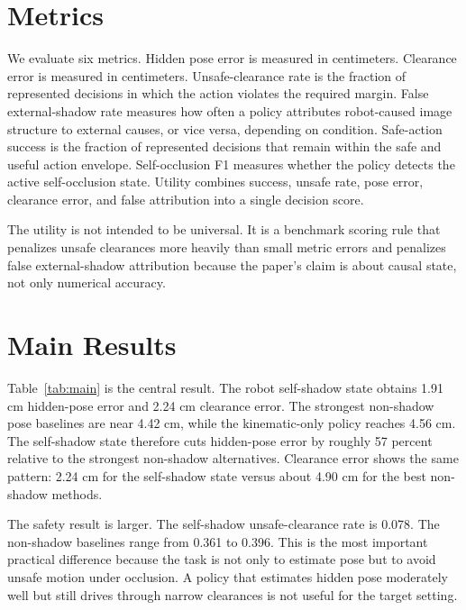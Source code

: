 \documentclass{article}
\begin{document}
\section{Metrics}

We evaluate six metrics. Hidden pose error is measured in centimeters. Clearance error is measured in centimeters. Unsafe-clearance rate is the fraction of represented decisions in which the action violates the required margin. False external-shadow rate measures how often a policy attributes robot-caused image structure to external causes, or vice versa, depending on condition. Safe-action success is the fraction of represented decisions that remain within the safe and useful action envelope. Self-occlusion F1 measures whether the policy detects the active self-occlusion state. Utility combines success, unsafe rate, pose error, clearance error, and false attribution into a single decision score.

The utility is not intended to be universal. It is a benchmark scoring rule that penalizes unsafe clearances more heavily than small metric errors and penalizes false external-shadow attribution because the paper's claim is about causal state, not only numerical accuracy.

\section{Main Results}

\begin{table}[t]
\centering
\small

\caption{Aggregate policy performance across all 302,400 compact condition rows. Pose and clearance errors are centimeters. Higher F1, success, and utility are better; lower error and unsafe rate are better.}
\label{tab:main}
\end{table}

Table~\ref{tab:main} is the central result. The robot self-shadow state obtains 1.91 cm hidden-pose error and 2.24 cm clearance error. The strongest non-shadow pose baselines are near 4.42 cm, while the kinematic-only policy reaches 4.56 cm. The self-shadow state therefore cuts hidden-pose error by roughly 57 percent relative to the strongest non-shadow alternatives. Clearance error shows the same pattern: 2.24 cm for the self-shadow state versus about 4.90 cm for the best non-shadow methods.

The safety result is larger. The self-shadow unsafe-clearance rate is 0.078. The non-shadow baselines range from 0.361 to 0.396. This is the most important practical difference because the task is not only to estimate pose but to avoid unsafe motion under occlusion. A policy that estimates hidden pose moderately well but still drives through narrow clearances is not useful for the target setting.
\end{document}
